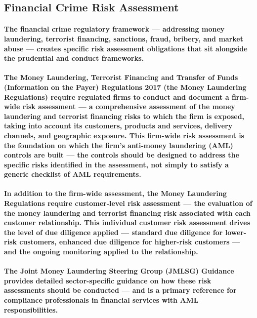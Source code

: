 \subsection{Financial Crime Risk Assessment}
\paragraph{The \textbf{financial crime regulatory framework} — addressing money laundering, terrorist financing, sanctions, fraud, bribery, and market abuse — creates specific risk assessment obligations that sit alongside the prudential and conduct frameworks.}
\paragraph{The \textbf{Money Laundering, Terrorist Financing and Transfer of Funds (Information on the Payer) Regulations 2017} (the Money Laundering Regulations) require regulated firms to conduct and document a \textbf{firm-wide risk assessment} — a comprehensive assessment of the money laundering and terrorist financing risks to which the firm is exposed, taking into account its customers, products and services, delivery channels, and geographic exposure. This firm-wide risk assessment is the foundation on which the firm's anti-money laundering (AML) controls are built — the controls should be designed to address the specific risks identified in the assessment, not simply to satisfy a generic checklist of AML requirements.}
\paragraph{In addition to the firm-wide assessment, the Money Laundering Regulations require customer-level risk assessment — the evaluation of the money laundering and terrorist financing risk associated with each customer relationship. This individual customer risk assessment drives the level of due diligence applied — standard due diligence for lower-risk customers, enhanced due diligence for higher-risk customers — and the ongoing monitoring applied to the relationship.}
\paragraph{The \textbf{Joint Money Laundering Steering Group (JMLSG) Guidance} provides detailed sector-specific guidance on how these risk assessments should be conducted — and is a primary reference for compliance professionals in financial services with AML responsibilities.}

